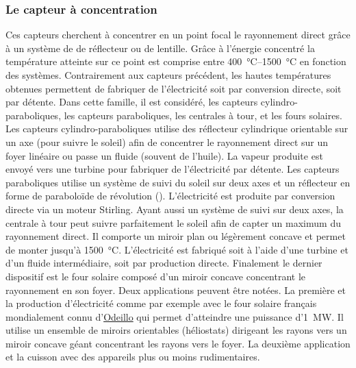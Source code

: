 \subsubsection{Le capteur à concentration} %
\label{ssub:le_capteur_a_concentration}
Ces capteurs cherchent à concentrer en un point focal le rayonnement direct
grâce à un système de de réflecteur ou de lentille. Grâce à l’énergie concentré
la température atteinte sur ce point est comprise entre \SIrange{400}{1500}{\celsius}
en fonction des systèmes. Contrairement aux capteurs précédent, les hautes températures
obtenues permettent de fabriquer de l’électricité soit par conversion directe, soit par
détente. Dans cette famille, il est considéré, les capteurs
cylindro-paraboliques, les capteurs paraboliques, les centrales à tour, et les
fours solaires.
Les capteurs cylindro-paraboliques utilise des réflecteur cylindrique orientable
sur un axe (pour suivre le soleil) afin de concentrer le rayonnement direct sur un
foyer linéaire ou passe un fluide (souvent de l’huile). La vapeur produite est envoyé
vers une turbine pour fabriquer de l’électricité par détente.
Les capteurs paraboliques utilise un système de suivi du soleil sur deux axes
et un réflecteur en forme de paraboloïde de révolution ().
L’électricité est produite par conversion directe via un moteur Stirling.
Ayant aussi un système de suivi sur deux axes, la centrale à tour peut suivre parfaitement
le soleil afin de capter un maximum du rayonnement direct. Il comporte un miroir
plan ou légèrement concave et permet de monter jusqu’à \SI{1500}{\celsius}. L’électricité
est fabriqué soit à l’aide d’une turbine et d’un fluide intermédiaire, soit par
production directe. Finalement le dernier dispositif est le four solaire
composé d’un miroir concave concentrant le rayonnement en son foyer. Deux applications
peuvent être notées. La première et la production d’électricité
comme par exemple avec le four solaire français mondialement connu
d’\href{http://www.promes.cnrs.fr/index.php?page=historique}{Odeillo}
qui permet d’atteindre une puissance d’\SI{1}{\mega\watt}. Il utilise un ensemble
de miroirs orientables (héliostats) dirigeant les rayons vers un miroir concave géant
concentrant les rayons vers le foyer. La deuxième application et la cuisson avec
des appareils plus ou moins rudimentaires.



